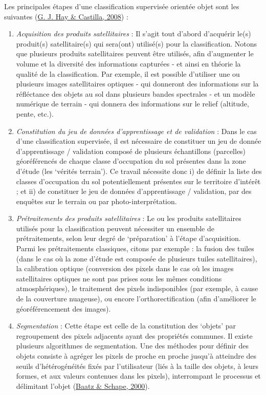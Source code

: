 \documentclass[12pt,twoside]{reedthesis}
\providecommand{\tightlist}{%
  \setlength{\itemsep}{0pt}\setlength{\parskip}{0pt}}
\begin{document}
\begin{lightcyanbox}
Les principales étapes d'une classification supervisée orientée objet sont les suivantes (\protect\hyperlink{ref-blaschke_geographic_2008}{G. J. Hay \& Castilla, 2008}) :
\begin{enumerate}
\def\labelenumi{\arabic{enumi}.}
\tightlist
\item
  \emph{Acquisition des produits satellitaires} : Il s'agit tout d'abord d'acquérir le(s) produit(s) satellitaire(s) qui sera(ont) utilisé(s) pour la classification. Notons que plusieurs produits satellitaires peuvent être utilisés, afin d'augmenter le volume et la diversité des informations capturées - et ainsi en théorie la qualité de la classification. Par exemple, il est possible d'utiliser une ou plusieurs images satellitaires optiques - qui donneront des informations sur la réfléctance des objets au sol dans plusieurs bandes spectrales - et un modèle numérique de terrain - qui donnera des informations sur le relief (altitude, pente, etc.).
\item
  \emph{Constitution du jeu de données d'apprentissage et de validation} : Dans le cas d'une classification supervisée, il est nécessaire de constituer un jeu de donnée d'apprentissage / validation composé de plusieurs échantillons (parcelles) géoréférencés de chaque classe d'occupation du sol présentes dans la zone d'étude (les `vérités terrain'). Ce travail nécessite donc i) de définir la liste des classes d'occupation du sol potentiellement présentes sur le territoire d'intérêt ; et ii) de constituer le jeu de données d'apprentissage / validation, par des enquêtes sur le terrain ou par photo-interprétation.
\item
  \emph{Prétraitements des produits satellitaires} : Le ou les produits satellitaires utilisés pour la classification peuvent nécessiter un ensemble de prétraitements, selon leur degré de `préparation' à l'étape d'acquisition. Parmi les prétraitements classiques, citons par exemple : la fusion des tuiles (dans le cas où la zone d'étude est composée de plusieurs tuiles satellitaires), la calibration optique (conversion des pixels dans le cas où les images satellitaires optiques ne sont pas prises sous les mêmes conditions atmosphériques), le traitement des pixels indisponibles (par exemple, à cause de la couverture nuageuse), ou encore l'orthorectification (afin d'améliorer le géoréférencement des images).
\item
  \emph{Segmentation} : Cette étape est celle de la constitution des `objets' par regroupement des pixels adjacents ayant des propriétés communes. Il existe plusieurs algorithmes de segmentation. Une des méthodes pour définir des objets consiste à agréger les pixels de proche en proche jusqu'à atteindre des seuils d'hétérogénéités fixés par l'utilisateur (liés à la taille des objets, à leurs formes, et aux valeurs contenues dans les pixels), interrompant le processus et délimitant l'objet (\protect\hyperlink{ref-baatz_schape_2000}{Baatz \& Schape, 2000}).

\end{enumerate}
\end{lightcyanbox}
\end{document}
